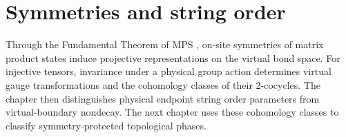
\chapter{Symmetries and string order}\label{ch:symmetry}

Through the Fundamental Theorem of MPS
\cite{PerezGarcia2007Matrix,PerezGarcia2008StringOrder}, on-site symmetries of
matrix product states induce projective representations on the virtual bond space. For injective tensors,
invariance under a physical group action determines virtual gauge transformations
and the cohomology classes of their 2-cocycles. The chapter then distinguishes
physical endpoint string order parameters from virtual-boundary nondecay. The
next chapter uses these cohomology classes to classify symmetry-protected
topological phases.



